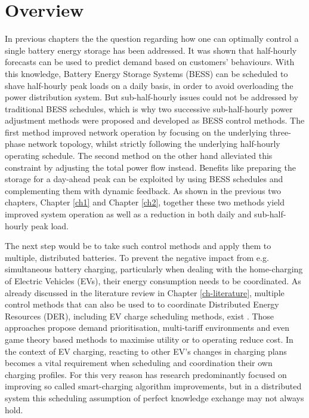 \section{Overview}
\label{ch3:sec:overview}

In previous chapters the the question regarding how one can optimally control a single battery energy storage has been addressed.
It was shown that half-hourly forecasts can be used to predict demand based on customers' behaviours.
With this knowledge, Battery Energy Storage Systems (BESS) can be scheduled to shave half-hourly peak loads on a daily basis, in order to avoid overloading the power distribution system.
But sub-half-hourly issues could not be addressed by traditional BESS schedules, which is why two successive sub-half-hourly power adjustment methods were proposed and developed as BESS control methods.
The first method improved network operation by focusing on the underlying three-phase network topology, whilst strictly following the underlying half-hourly operating schedule.
The second method on the other hand alleviated this constraint by adjusting the total power flow instead.
Benefits like preparing the storage for a day-ahead peak can be exploited by using BESS schedules and complementing them with dynamic feedback.
As shown in the previous two chapters, Chapter \ref{ch1} and Chapter \ref{ch2}, together these two methods yield improved system operation as well as a reduction in both daily and sub-half-hourly peak load.

The next step would be to take such control methods and apply them to multiple, distributed batteries.
To prevent the negative impact from e.g. simultaneous battery charging, particularly when dealing with the home-charging of Electric Vehicles (EVs), their energy consumption needs to be coordinated.
As already discussed in the literature review in Chapter \ref{ch-literature}, multiple control methods that can also be used to to coordinate Distributed Energy Resources (DER), including EV charge scheduling methods, exist \cite{Atia2016, Bidram2012, Bidram2014, Dolan2012, Gill2014, Guerrero2008, Guerrero2013, Sugihara2013, Toledo2013, Wang2016, Vovos2007, Guerrero2013a, Mansouri-Samani1993, Marra2013, Mokhtari2013}. 
Those approaches propose demand prioritisation, multi-tariff environments and even game theory based methods to maximise utility or to operating reduce cost.
In the context of EV charging, reacting to other EV's changes in charging plans becomes a vital requirement when scheduling and coordination their own charging profiles.
For this very reason has research predominantly focused on improving so called smart-charging algorithm improvements, but in a distributed system this scheduling assumption of perfect knowledge exchange may not always hold.

